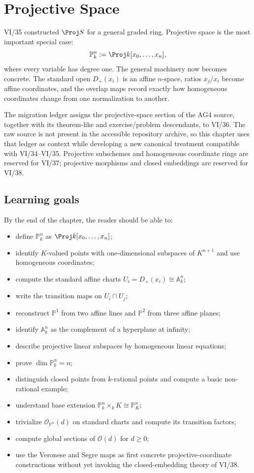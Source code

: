 \chapter{Projective Space}
\label{ch:vi36-projective-space}

VI/35 constructed \(\Proj S\) for a general graded ring.  Projective space is the most important special case:
\[
  \mathbb P^n_k:=\Proj k[x_0,\ldots,x_n],
\]
where every variable has degree one.  The general machinery now becomes concrete.  The standard open \(D_+(x_i)\) is an affine \(n\)-space, ratios \(x_j/x_i\) become affine coordinates, and the overlap maps record exactly how homogeneous coordinates change from one normalization to another.

The migration ledger assigns the projective-space section of the AG4 source, together with its theorem-like and exercise/problem descendants, to VI/36.  The raw source is not present in the accessible repository archive, so this chapter uses that ledger as context while developing a new canonical treatment compatible with VI/34--VI/35.  Projective subschemes and homogeneous coordinate rings are reserved for VI/37; projective morphisms and closed embeddings are reserved for VI/38.

\section*{Learning goals}
By the end of the chapter, the reader should be able to:
\begin{itemize}
\item define \(\mathbb P^n_k\) as \(\Proj k[x_0,\ldots,x_n]\);
\item identify \(K\)-valued points with one-dimensional subspaces of \(K^{n+1}\) and use homogeneous coordinates;
\item compute the standard affine charts \(U_i=D_+(x_i)\cong\mathbb A^n_k\);
\item write the transition maps on \(U_i\cap U_j\);
\item reconstruct \(\mathbb P^1\) from two affine lines and \(\mathbb P^2\) from three affine planes;
\item identify \(\mathbb A^n_k\) as the complement of a hyperplane at infinity;
\item describe projective linear subspaces by homogeneous linear equations;
\item prove \(\dim\mathbb P^n_k=n\);
\item distinguish closed points from \(k\)-rational points and compute a basic non-rational example;
\item understand base extension \(\mathbb P^n_k\times_k K\cong\mathbb P^n_K\);
\item trivialize \(\mathcal O_{\mathbb P^n}(d)\) on standard charts and compute its transition factors;
\item compute global sections of \(\mathcal O(d)\) for \(d\ge0\);
\item use the Veronese and Segre maps as first concrete projective-coordinate constructions without yet invoking the closed-embedding theory of VI/38.
\end{itemize}

